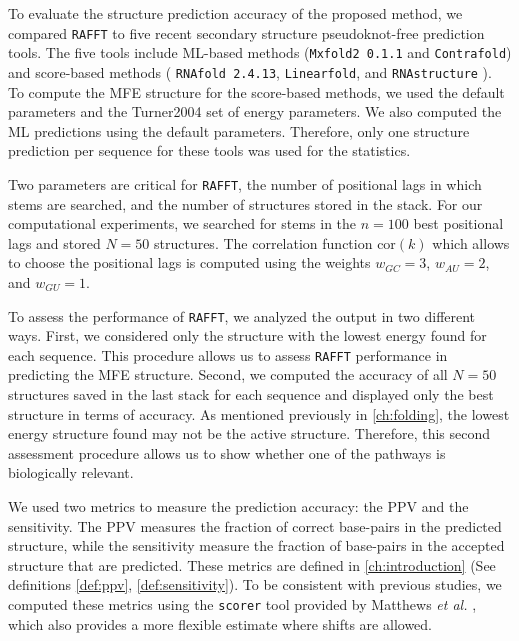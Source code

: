 To evaluate the structure prediction accuracy of the proposed method, we compared \texttt{RAFFT} to five recent secondary structure pseudoknot-free prediction tools. The five tools include \ac{ML}-based methods (\texttt{Mxfold2 0.1.1} and \texttt{Contrafold}) and score-based methods ( \texttt{RNAfold 2.4.13},  \texttt{Linearfold},  and \texttt{RNAstructure} ). To compute the \ac{MFE} structure for the score-based methods, we used the default parameters and the Turner2004 set of energy parameters. We also computed the \ac{ML} predictions using the default parameters. Therefore, only one structure prediction per sequence for these tools was used for the statistics.

Two parameters are critical for \texttt{RAFFT}, the number of positional lags in which stems are searched, and the number of structures stored in the stack. For our computational experiments, we searched for stems in the $n=100$ best positional lags and stored $N=50$ structures. The correlation function \(\text{cor}(k)\) which allows to choose the positional lags is computed using the weights \(w_{GC}=3\), \(w_{AU}=2\), and \(w_{GU}=1\).

To assess the performance of \texttt{RAFFT}, we analyzed the output in two different ways. First, we considered only the structure with the lowest energy found for each sequence. This procedure allows us to assess \texttt{RAFFT} performance in predicting the \ac{MFE} structure. Second, we computed the accuracy of all $N=50$ structures saved in the last stack for each sequence and displayed only the best structure in terms of accuracy. As mentioned previously in \autoref{ch:folding}, the lowest energy structure found may not be the active structure. Therefore, this second assessment procedure allows us to show whether one of the pathways is biologically relevant.

We used two metrics to measure the prediction accuracy: the \ac{PPV} and the sensitivity. The \ac{PPV} measures the fraction of correct base-pairs in the predicted structure, while the sensitivity measure the fraction of base-pairs in the accepted structure that are predicted. These metrics are defined in \autoref{ch:introduction} (See definitions \autoref{def:ppv}, \autoref{def:sensitivity}). 
To be consistent with previous studies, we computed these metrics using the \texttt{scorer} tool provided by Matthews \emph{et al.} \cite{mathews19_how_to_bench_rna_secon}, which also provides a more flexible estimate where shifts are allowed.

